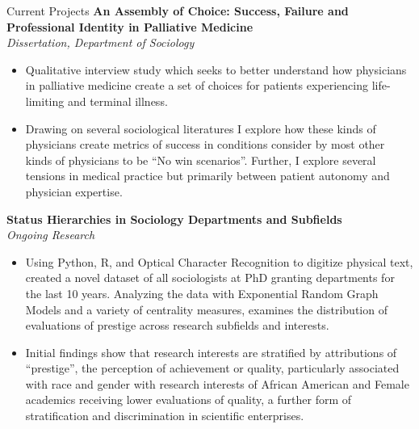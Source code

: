 \documentclass{resume}
\begin{document}
\begin{rSection}{Current Projects}
\noindent \textbf{An Assembly of Choice: Success, Failure and Professional Identity in Palliative Medicine}  \\
\textit{Dissertation, Department of Sociology} %
\begin{itemize}[noitemsep,nolistsep,leftmargin=*]
\item {Qualitative interview study which seeks to better understand how physicians in palliative medicine create a set of choices for patients experiencing life-limiting and terminal illness. }
\item { Drawing on several sociological literatures I explore how these kinds of physicians create metrics of success in conditions consider by most other kinds of physicians to be ``No win scenarios''. Further, I explore several tensions in medical practice but primarily between patient autonomy and physician expertise. \\}

\end{itemize}

\noindent \textbf{Status Hierarchies in Sociology Departments and Subfields}  \\
\textit{Ongoing Research} %
\begin{itemize}[noitemsep,nolistsep,leftmargin=*]
\item {Using Python, R, and Optical Character Recognition to digitize physical text, created a novel dataset of all sociologists at PhD granting departments for the last 10 years. Analyzing the data with Exponential Random Graph Models and a variety of centrality measures, examines the distribution of evaluations of prestige across research subfields and interests.}
\item {Initial findings show that research interests are stratified by attributions of ``prestige'', the perception of achievement or quality, particularly associated with race and gender with research interests of African American and Female academics receiving lower evaluations of quality, a further form of stratification and discrimination in scientific enterprises. \\}
\end{itemize}


\end{rSection}
\end{document}
